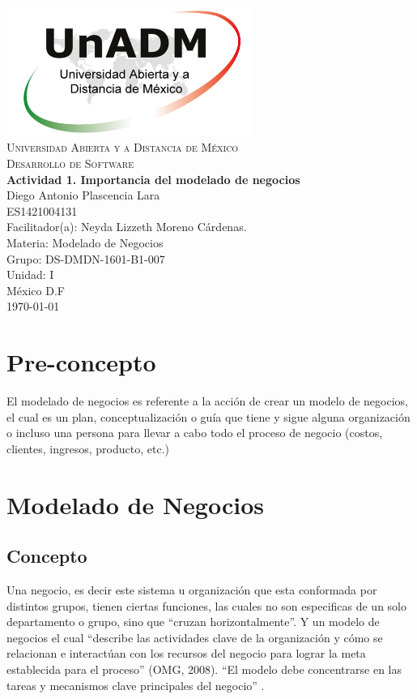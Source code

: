 \documentclass[spanish,12pt,letterpapper]{article}
\begin{document}
	\begin{titlepage}
		\begin{center}
			\includegraphics[width=0.6\textwidth]{./logoUnADM}~\\[1cm] 
			\textsc{Universidad Abierta y a Distancia de México}\\[0.8cm]
			\textsc{Desarrollo de Software}\\[1.8cm]
			
			\textbf{ \Large Actividad 1. Importancia del modelado de negocios}\\[3cm]
			
			Diego Antonio Plascencia Lara\\ ES1421004131 \\[0.4cm]
			Facilitador(a): Neyda Lizzeth Moreno Cárdenas.\\
			Materia: Modelado de Negocios\\
			Grupo: DS-DMDN-1601-B1-007 \\
			Unidad: I \\
			
			\vfill México D.F\\{\today}
			
		\end{center}
	\end{titlepage}
	
	\section{Pre-concepto \\}
	El modelado de negocios es referente a la acción de crear un modelo de negocios, el cual es un plan, conceptualización o guía que tiene y sigue alguna organización o incluso una persona para llevar a cabo todo el proceso de negocio (costos, clientes, ingresos, producto, etc.) \\
	
	\section{Modelado de Negocios}
	\subsection{Concepto}
	Una negocio, es decir este sistema u organización que esta conformada por distintos grupos, tienen ciertas funciones, las cuales no son especificas de un solo departamento o grupo, sino que ``cruzan horizontalmente''. Y un modelo de negocios el cual ``describe las actividades clave de la organización y cómo se relacionan e interactúan con los recursos del negocio para lograr la meta establecida para el proceso'' (OMG,
	2008). ``El modelo debe concentrarse en las tareas y mecanismos clave principales del negocio'' \cite{panAdm}. \\
	
\end{document}
